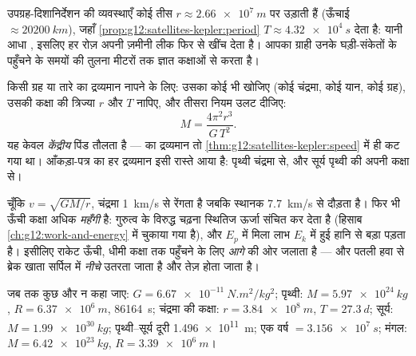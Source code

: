 \begin{example}[दिशा-निर्देशन का मंडल]\label{ex:g12:satellites-kepler:gps}
उपग्रह-दिशानिर्देशन की व्यवस्थाएँ कोई तीस  $r \approx \qty{2.66e7}{m}$ पर उड़ाती
हैं (ऊँचाई $\approx \qty{20200}{km}$), जहाँ \cref{prop:g12:satellites-kepler:period} $T \approx
\qty{4.32e4}{s}$ देता है: यानी आधा
, इसलिए हर  रोज़ अपनी ज़मीनी लीक फिर से
खींच देता है। आपका ग्राही उनके घड़ी-संकेतों के पहुँचने के समयों की
तुलना मीटरों तक ज्ञात कक्षाओं से करता है।
\end{example}

\begin{method}\label{met:g12:satellites-kepler:weigh}
%
किसी ग्रह या तारे का द्रव्यमान नापने के लिए: उसका कोई भी 
खोजिए (कोई चंद्रमा, कोई यान, कोई ग्रह), उसकी कक्षा की त्रिज्या
$r$ और  $T$ नापिए, और तीसरा नियम उलट दीजिए:
\[ M = \frac{4\pi^2 r^3}{G\,T^2}. \]
यह केवल \emph{केंद्रीय} पिंड तौलता है ---  का द्रव्यमान तो
\cref{thm:g12:satellites-kepler:speed} में ही कट गया था। आँकड़ा-पत्र का हर द्रव्यमान इसी रास्ते आया है:
पृथ्वी चंद्रमा से, और सूर्य पृथ्वी की अपनी कक्षा से।
\end{method}

\begin{remark}[ऊँचा यानी धीमा --- पर महँगा भी]\label{rem:g12:satellites-kepler:energy}
चूँकि $v = \sqrt{GM/r}$, चंद्रमा \qty{1}{km/s} से रेंगता है जबकि स्थानक \qty{7.7}{km/s} से दौड़ता है।
फिर भी ऊँची कक्षा अधिक \emph{महँगी} है: गुरुत्व के विरुद्ध चढ़ना
स्थितिज ऊर्जा संचित कर देता है (हिसाब \cref{ch:g12:work-and-energy} में चुकाया गया है), और
$E_p$ में मिला लाभ $E_k$ में हुई हानि से बड़ा पड़ता है। इसीलिए राकेट ऊँची,
धीमी कक्षा तक पहुँचने के लिए \emph{आगे} की ओर जलाता है --- और
पतली हवा से ब्रेक खाता  सर्पिल में \emph{नीचे} उतरता
जाता है और तेज़ होता जाता है।
\end{remark}

\begin{remark}[आँकड़ा-पत्र]\label{rem:g12:satellites-kepler:data}
जब तक कुछ और न कहा जाए: $G = \qty{6.67e-11}{N.m^2/kg^2}$; पृथ्वी: $M = \qty{5.97e24}{kg}$, $R = \qty{6.37e6}{m}$,  \qty{86164}{s}; चंद्रमा की कक्षा: $r = \qty{3.84e8}{m}$, $T =
\qty{27.3}{d}$; सूर्य: $M = \qty{1.99e30}{kg}$;
पृथ्वी--सूर्य दूरी \qty{1.496e11}{m}; एक वर्ष $= \qty{3.156e7}{s}$; मंगल: $M =
\qty{6.42e23}{kg}$, $R = \qty{3.39e6}{m}$।
\end{remark}

